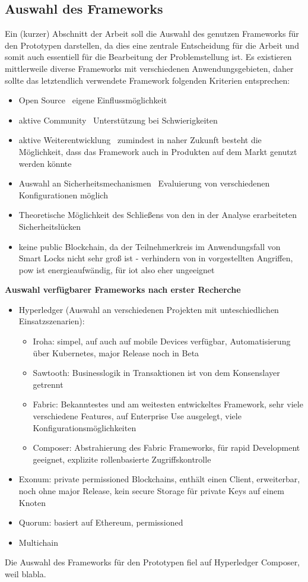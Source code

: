\subsection{Auswahl des Frameworks}
\label{sec:prototype_framework}
    Ein (kurzer) Abschnitt der Arbeit soll die Auswahl des genutzen Frameworks für den Prototypen darstellen, da dies eine zentrale Entscheidung für die Arbeit und somit auch essentiell für die Bearbeitung der Problemstellung ist.
    Es existieren mittlerweile diverse Frameworks mit verschiedenen Anwendungsgebieten, daher sollte das letztendlich verwendete Framework folgenden Kriterien entsprechen:
    \begin{itemize}[noitemsep]
        \item Open Source \textrightarrow\ eigene Einflussmöglichkeit
        \item aktive Community \textrightarrow\ Unterstützung bei Schwierigkeiten
        \item aktive Weiterentwicklung \textrightarrow\ zumindest in naher Zukunft besteht die Möglichkeit, dass das Framework auch in Produkten auf dem Markt genutzt werden könnte
        \item Auswahl an Sicherheitsmechanismen \textrightarrow\ Evaluierung von verschiedenen Konfigurationen möglich
        \item Theoretische Möglichkeit des Schließens von den in der Analyse erarbeiteten Sicherheitslücken
        \item keine public Blockchain, da der Teilnehmerkreis im Anwendungsfall von Smart Locks nicht sehr groß ist - verhindern von in  vorgestellten Angriffen, \gls{pow} ist energieaufwändig, für \gls{iot} also eher ungeeignet
    \end{itemize}
    \medskip
    \textbf{Auswahl verfügbarer Frameworks nach erster Recherche}
    \begin{itemize}[noitemsep]
        \item Hyperledger (Auswahl an verschiedenen Projekten mit unteschiedlichen Einsatzszenarien):
            \begin{itemize}[noitemsep]
                \item Iroha: simpel, auf auch auf mobile Devices verfügbar, Automatisierung über Kubernetes, major Release noch in Beta
                \item Sawtooth: Businesslogik in Transaktionen ist von dem Konsenslayer getrennt
                \item Fabric: Bekanntestes und am weitesten entwickeltes Framework, sehr viele verschiedene Features, auf Enterprise Use ausgelegt, viele Konfigurationsmöglichkeiten
                \item Composer: Abstrahierung des Fabric Frameworks, für rapid Development geeignet, explizite rollenbasierte Zugriffskontrolle
            \end{itemize}
        \item Exonum: private permissioned Blockchains, enthält einen Client, erweiterbar, noch ohne major Release, kein secure Storage für private Keys auf einem Knoten
        \item Quorum: basiert auf Ethereum, permissioned
        \item Multichain
    \end{itemize}
    Die Auswahl des Frameworks für den Prototypen fiel auf Hyperledger Composer, weil blabla.
